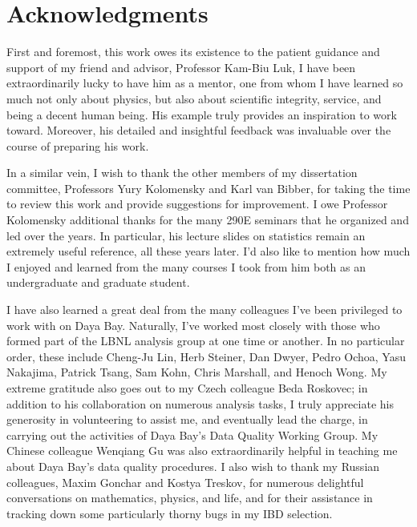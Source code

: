 \documentclass[../thesis.tex]{subfiles}
\begin{document}
\chapter*[Acknowledgments]{Acknowledgments}

First and foremost, this work owes its existence to the patient guidance and support of my friend and advisor, Professor Kam-Biu Luk, I have been extraordinarily lucky to have him as a mentor, one from whom I have learned so much not only about physics, but also about scientific integrity, service, and being a decent human being. His example truly provides an inspiration to work toward. Moreover, his detailed and insightful feedback was invaluable over the course of preparing his work.

In a similar vein, I wish to thank the other members of my dissertation committee, Professors Yury Kolomensky and Karl van Bibber, for taking the time to review this work and provide suggestions for improvement. I owe Professor Kolomensky additional thanks for the many 290E seminars that he organized and led over the years. In particular, his lecture slides on statistics remain an extremely useful reference, all these years later. I'd also like to mention how much I enjoyed and learned from the many courses I took from him both as an undergraduate and graduate student.

I have also learned a great deal from the many colleagues I've been privileged to work with on Daya Bay. Naturally, I've worked most closely with those who formed part of the LBNL analysis group at one time or another. In no particular order, these include Cheng-Ju Lin, Herb Steiner, Dan Dwyer, Pedro Ochoa, Yasu Nakajima, Patrick Tsang, Sam Kohn, Chris Marshall, and Henoch Wong. My extreme gratitude also goes out to my Czech colleague Beda Roskovec; in addition to his collaboration on numerous analysis tasks, I truly appreciate his generosity in volunteering to assist me, and eventually lead the charge, in carrying out the activities of Daya Bay's Data Quality Working Group. My Chinese colleague Wenqiang Gu was also extraordinarily helpful in teaching me about Daya Bay's data quality procedures. I also wish to thank my Russian colleagues, Maxim Gonchar and Kostya Treskov, for numerous delightful conversations on mathematics, physics, and life, and for their assistance in tracking down some particularly thorny bugs in my IBD selection.
\end{document}
